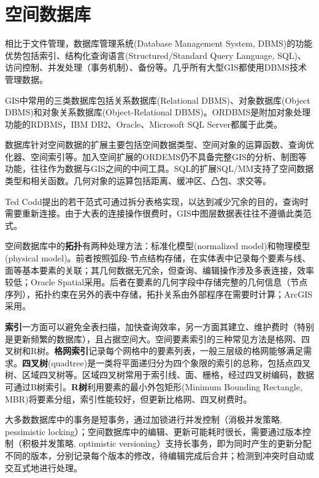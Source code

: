\section{空间数据库}
\par 相比于文件管理，数据库管理系统(Database Management System, DBMS)的功能优势包括索引、结构化查询语言(Structured/Standard Query Language, SQL)、访问控制、并发处理（事务机制）、备份等。几乎所有大型GIS都使用DBMS技术管理数据。

\par GIS中常用的三类数据库包括关系数据库(Relational DBMS)、对象数据库(Object DBMS)和对象关系数据库(Object-Relational DBMS)。ORDBMS是附加对象处理功能的RDBMS，IBM DB2、Oracle、Microsoft SQL Server都属于此类。

\par 数据库针对空间数据的扩展主要包括空间数据类型、空间对象的运算函数、查询优化器、空间索引等。加入空间扩展的ORDEMS仍不具备完整GIS的分析、制图等功能，往往作为数据与GIS之间的中间工具。SQL的扩展SQL/MM支持了空间数据类型和相关函数。几何对象的运算包括距离、缓冲区、凸包、求交等。

\par Ted Codd提出的若干范式可通过拆分表格实现，以达到减少冗余的目的，查询时需要重新连接。由于大表的连接操作很费时，GIS中图层数据表往往不遵循此类范式。

\par 空间数据库中的\textbf{拓扑}有两种处理方法：标准化模型(normalized model)和物理模型(physical model)。前者按照弧段-节点结构存储，在实体表中记录每个要素与线、面等基本要素的关联；其几何数据无冗余，但查询、编辑操作涉及多表连接，效率较低；Oracle Spatial采用。后者在要素的几何字段中存储完整的几何信息（节点序列），拓扑约束在另外的表中存储，拓扑关系由外部程序在需要时计算；ArcGIS采用。

\par \textbf{索引}一方面可以避免全表扫描，加快查询效率，另一方面其建立、维护费时（特别是更新频繁的数据库），且占据空间大。空间要素索引的三种常见方法是格网、四叉树和R树。\textbf{格网索引}记录每个网格中的要素列表，一般三层级的格网能够满足需求。\textbf{四叉树}(quadtree)是一类将平面递归分为四个象限的索引的总称，包括点四叉树、区域四叉树等。区域四叉树常用于索引线、面、栅格，经过四叉树编码，数据可通过B树索引。\textbf{R树}利用要素的最小外包矩形(Minimum Bounding Rectangle,  MBR)将要素分组，索引性能较好，但更新比格网、四叉树费时。

\par 大多数数据库中的事务是短事务，通过加锁进行并发控制（消极并发策略, pessimistic locking）；空间数据库中的编辑、更新可能耗时很长，需要通过版本控制（积极并发策略, optimistic versioning）支持长事务，即为同时产生的更新分配不同的版本，分别记录每个版本的修改，待编辑完成后合并；检测到冲突时自动或交互式地进行处理。

